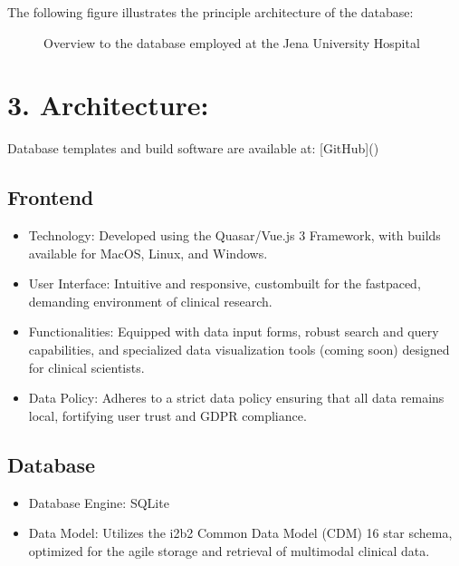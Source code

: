 \documentclass[a4paper,10pt,english]{sphinxmanual}
\begin{document}
\sphinxAtStartPar
The following figure illustrates the principle architecture of the database:

\begin{figure}[htbp]
\centering
\capstart

\noindent{}
\caption{Overview to the database employed at the Jena University Hospital}\label{\detokenize{TechnicalDetails:id2}}\end{figure}


\chapter{3. Architecture:}
\label{\detokenize{TechnicalDetails:architecture}}
\sphinxAtStartPar
Database templates and build software are available at: {[}GitHub{]}()


\section{Frontend}
\label{\detokenize{TechnicalDetails:frontend}}\begin{itemize}
\item {} 
\sphinxAtStartPar
Technology: Developed using the Quasar/Vue.js 3 Framework, with builds available for MacOS, Linux, and Windows.

\item {} 
\sphinxAtStartPar
User Interface: Intuitive and responsive, custom\sphinxhyphen{}built for the fast\sphinxhyphen{}paced, demanding environment of clinical research.

\item {} 
\sphinxAtStartPar
Functionalities: Equipped with data input forms, robust search and query capabilities, and specialized data visualization tools (coming soon) designed for clinical scientists.

\item {} 
\sphinxAtStartPar
Data Policy: Adheres to a strict data policy ensuring that all data remains local, fortifying user trust and GDPR compliance.

\end{itemize}


\section{Database}
\label{\detokenize{TechnicalDetails:database}}\begin{itemize}
\item {} 
\sphinxAtStartPar
Database Engine: SQLite

\item {} 
\sphinxAtStartPar
Data Model: Utilizes the i2b2 Common Data Model (CDM) 16 star schema, optimized for the agile storage and retrieval of multimodal clinical data.

\end{itemize}
\end{document}

